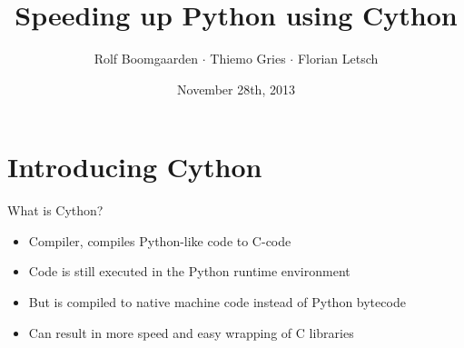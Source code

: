 \documentclass[dvipsnames]{beamer}
\title{Speeding up Python using Cython}
\author[Rolf $\cdot$ Thiemo $\cdot$ Flo]{Rolf Boomgaarden $\cdot$ Thiemo Gries $\cdot$ Florian Letsch}
\institute{Universität Hamburg}
\date{November 28th, 2013}
\begin{document}
\frame
{
\titlepage
}


\section{Introducing Cython}
\begin{frame}{What is Cython?}
\begin{itemize}
\item Compiler, compiles Python-like code to C-code
\item Code is still executed in the Python runtime environment
\item But is compiled to native machine code instead of Python bytecode
\item Can result in more speed and easy wrapping of C libraries
\end{itemize}
\end{frame}

\end{document}
